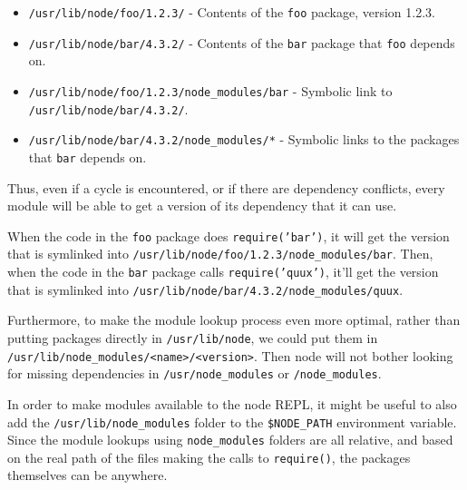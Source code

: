 \begin{itemize}
\itemsep1pt\parskip0pt
\item
  \texttt{/usr/lib/node/foo/1.2.3/} - Contents of the \texttt{foo}
  package, version 1.2.3.
\item
  \texttt{/usr/lib/node/bar/4.3.2/} - Contents of the \texttt{bar}
  package that \texttt{foo} depends on.
\item
  \texttt{/usr/lib/node/foo/1.2.3/node\_modules/bar} - Symbolic link to
  \texttt{/usr/lib/node/bar/4.3.2/}.
\item
  \texttt{/usr/lib/node/bar/4.3.2/node\_modules/*} - Symbolic links to
  the packages that \texttt{bar} depends on.
\end{itemize}

Thus, even if a cycle is encountered, or if there are dependency
conflicts, every module will be able to get a version of its dependency
that it can use.

When the code in the \texttt{foo} package does \texttt{require('bar')},
it will get the version that is symlinked into
\texttt{/usr/lib/node/foo/1.2.3/node\_modules/bar}. Then, when the code
in the \texttt{bar} package calls \texttt{require('quux')}, it'll get
the version that is symlinked into
\texttt{/usr/lib/node/bar/4.3.2/node\_modules/quux}.

Furthermore, to make the module lookup process even more optimal, rather
than putting packages directly in \texttt{/usr/lib/node}, we could put
them in
\texttt{/usr/lib/node\_modules/\textless{}name\textgreater{}/\textless{}version\textgreater{}}.
Then node will not bother looking for missing dependencies in
\texttt{/usr/node\_modules} or \texttt{/node\_modules}.

In order to make modules available to the node REPL, it might be useful
to also add the \texttt{/usr/lib/node\_modules} folder to the
\texttt{\$NODE\_PATH} environment variable. Since the module lookups
using \texttt{node\_modules} folders are all relative, and based on the
real path of the files making the calls to \texttt{require()}, the
packages themselves can be anywhere.
